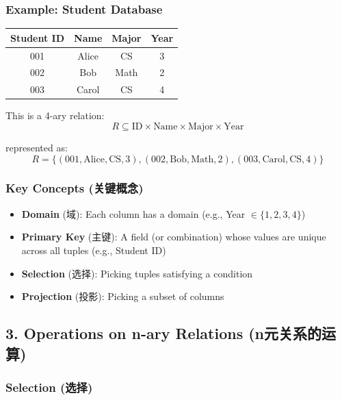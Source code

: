 \documentclass[10pt,a4paper,openany]{ctexbook}
\theoremstyle{definition}
\theoremstyle{remark}
\begin{document}
\subsubsection{Example: Student Database}

\begin{center}
\begin{tabular}{cccc}
\hline
Student ID & Name & Major & Year \\ \hline
001 & Alice & CS & 3 \\
002 & Bob & Math & 2 \\
003 & Carol & CS & 4 \\
\hline
\end{tabular}

\end{center}

This is a 4-ary relation:
\[
R \subseteq \text{ID} \times \text{Name} \times \text{Major} \times \text{Year}
\]

represented as:
\[
R = \{(001, \text{Alice}, \text{CS}, 3), (002, \text{Bob}, \text{Math}, 2), (003, \text{Carol}, \text{CS}, 4)\}
\]

\subsubsection{Key Concepts (关键概念)}

\begin{itemize}
\item \textbf{Domain} (域): Each column has a domain (e.g., Year $\in \{1,2,3,4\}$)
\item \textbf{Primary Key} (主键): A field (or combination) whose values are unique across all tuples (e.g., Student ID)
\item \textbf{Selection} (选择): Picking tuples satisfying a condition
\item \textbf{Projection} (投影): Picking a subset of columns

\end{itemize}

\vspace{-2pt}

\subsection{3. Operations on n-ary Relations (n元关系的运算)}

\subsubsection{Selection (选择)}
\end{document}
